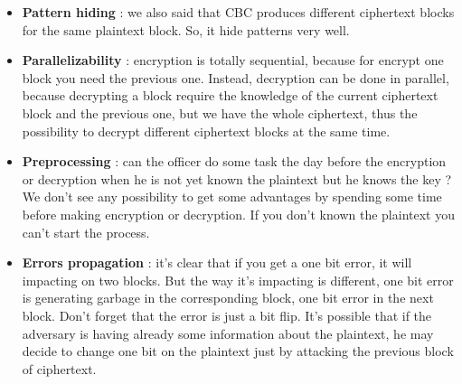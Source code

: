 \documentclass[11pt]{article}
\begin{document}
\begin{itemize}
\item \textbf{Pattern hiding} : we also said that CBC produces different ciphertext blocks for the same plaintext block. So, it hide patterns very well.
\item \textbf{Parallelizability} : encryption is totally sequential, because for encrypt one block you need the previous one. Instead, decryption can be done in parallel, because decrypting a block require the knowledge of the current ciphertext block and the previous one, but we have the whole ciphertext, thus the possibility to decrypt different ciphertext blocks at the same time.
\item \textbf{Preprocessing} : can the officer do some task the day before the encryption or decryption when he is not yet known the plaintext but he knows the key ? We don't see any possibility to get some advantages by spending some time before making encryption or decryption. If you don't known the plaintext you can't start the process.
\item \textbf{Errors propagation} : it's clear that if you get a one bit error, it will impacting on two blocks. But the way it's impacting is different, one bit error is generating garbage in the corresponding block, one bit error in the next block. Don't forget that the error is just a bit flip. It's possible that if the adversary is having already some information about the plaintext, he may decide to change one bit on the plaintext just by attacking the previous block of ciphertext.
\end{itemize}
\end{document}
